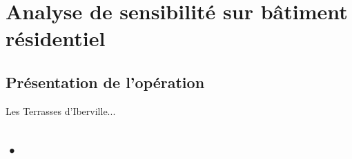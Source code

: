 \chapter{Analyse de sensibilité sur bâtiment résidentiel}

\section{Présentation de l'opération}

Les Terrasses d'Iberville...

\section{•}